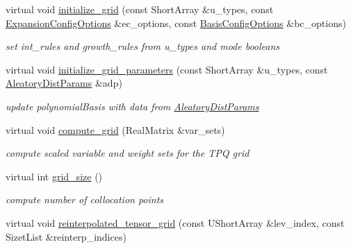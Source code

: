 \begin{DoxyCompactItemize}
virtual void \hyperlink{classPecos_1_1IntegrationDriver_a859f844ea03119f1e58183b8bb29f09b}{initialize\+\_\+grid} (const Short\+Array \&u\+\_\+types, const \hyperlink{classPecos_1_1ExpansionConfigOptions}{Expansion\+Config\+Options} \&ec\+\_\+options, const \hyperlink{classPecos_1_1BasisConfigOptions}{Basis\+Config\+Options} \&bc\+\_\+options)
\begin{DoxyCompactList}\small\item\em set int\+\_\+rules and growth\+\_\+rules from u\+\_\+types and mode booleans \end{DoxyCompactList}\item 
virtual void \hyperlink{classPecos_1_1IntegrationDriver_ad6505ab02359090a3dd26f8d3a232575}{initialize\+\_\+grid\+\_\+parameters} (const Short\+Array \&u\+\_\+types, const \hyperlink{classPecos_1_1AleatoryDistParams}{Aleatory\+Dist\+Params} \&adp)\label{classPecos_1_1IntegrationDriver_ad6505ab02359090a3dd26f8d3a232575}

\begin{DoxyCompactList}\small\item\em update polynomial\+Basis with data from \hyperlink{classPecos_1_1AleatoryDistParams}{Aleatory\+Dist\+Params} \end{DoxyCompactList}\item 
virtual void \hyperlink{classPecos_1_1IntegrationDriver_a30b0bccf09758808aeb7e9ca33fae2ff}{compute\+\_\+grid} (Real\+Matrix \&var\+\_\+sets)\label{classPecos_1_1IntegrationDriver_a30b0bccf09758808aeb7e9ca33fae2ff}

\begin{DoxyCompactList}\small\item\em compute scaled variable and weight sets for the T\+PQ grid \end{DoxyCompactList}\item 
virtual int \hyperlink{classPecos_1_1IntegrationDriver_a4b04c73f01f5eb9e6171305141eb1f73}{grid\+\_\+size} ()\label{classPecos_1_1IntegrationDriver_a4b04c73f01f5eb9e6171305141eb1f73}

\begin{DoxyCompactList}\small\item\em compute number of collocation points \end{DoxyCompactList}\item 
virtual void \hyperlink{classPecos_1_1IntegrationDriver_a875c01d83eb38586e43712a94e713312}{reinterpolated\+\_\+tensor\+\_\+grid} (const U\+Short\+Array \&lev\+\_\+index, const Sizet\+List \&reinterp\+\_\+indices)\label{classPecos_1_1IntegrationDriver_a875c01d83eb38586e43712a94e713312}


\end{DoxyCompactItemize}

